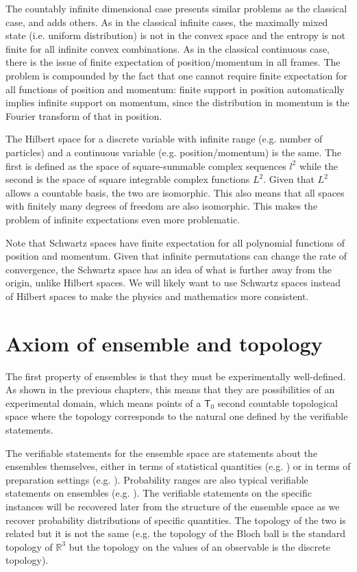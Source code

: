 The countably infinite dimensional case presents similar problems as the classical case, and adds others. As in the classical infinite cases, the maximally mixed state (i.e. uniform distribution) is not in the convex space and the entropy is not finite for all infinite convex combinations. As in the classical continuous case, there is the issue of finite expectation of position/momentum in all frames. The problem is compounded by the fact that one cannot require finite expectation for all functions of position and momentum: finite support in position automatically implies infinite support on momentum, since the distribution in momentum is the Fourier transform of that in position.

The Hilbert space for a discrete variable with infinite range (e.g. number of particles) and a continuous variable (e.g. position/momentum) is the same. The first is defined as the space of square-summable complex sequences $l^2$ while the second is the space of square integrable complex functions $L^2$. Given that $L^2$ allows a countable basis, the two are isomorphic. This also means that all spaces with finitely many degrees of freedom are also isomorphic. This makes the problem of infinite expectations even more problematic.

Note that Schwartz spaces have finite expectation for all polynomial functions of position and momentum. Given that infinite permutations can change the rate of convergence, the Schwartz space has an idea of what is further away from the origin, unlike Hilbert spaces. We will likely want to use Schwartz spaces instead of Hilbert spaces to make the physics and mathematics more consistent.

\section{Axiom of ensemble and topology}

The first property of ensembles is that they must be experimentally well-defined. As shown in the previous chapters, this means that they are possibilities of an experimental domain, which means points of a $\textsf{T}_0$ second countable topological space where the topology corresponds to the natural one defined by the verifiable statements.

The verifiable statements for the ensemble space are statements about the ensembles themselves, either in terms of statistical quantities (e.g. ) or in terms of preparation settings (e.g. ). Probability ranges are also typical verifiable statements on ensembles (e.g. ). The verifiable statements on the specific instances will be recovered later from the structure of the ensemble space as we recover probability distributions of specific quantities. The topology of the two is related but it is not the same (e.g. the topology of the Bloch ball is the standard topology of $\mathbb{R}^3$ but the topology on the values of an observable is the discrete topology).

